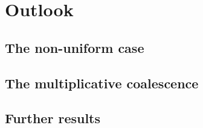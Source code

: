
\chapter{Outlook} \label{C: outlook}

\section{The non-uniform case}

\section{The multiplicative coalescence}

\section{Further results}